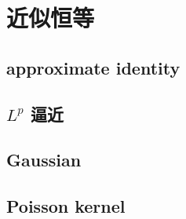 \section{近似恒等}
\label{b2:sec:0304}


\subsection{approximate identity}
\label{b2:subsec:030401}

\subsection{\texorpdfstring{\(L^p\)}{Lp} 逼近}
\label{b2:subsec:030402}

\subsection{Gaussian}
\label{b2:subsec:030403}

\subsection{Poisson kernel}
\label{b2:subsec:030404}


